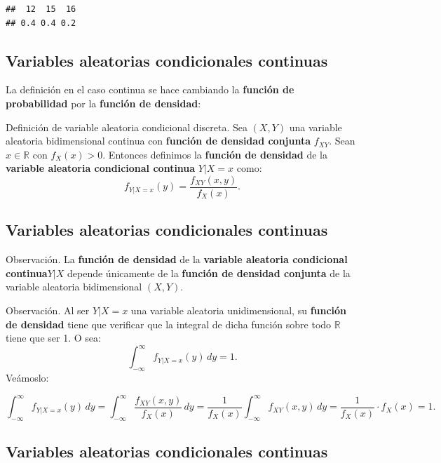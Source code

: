 \documentclass[]{book}
\begin{document}
\begin{verbatim}
##  12  15  16 
## 0.4 0.4 0.2
\end{verbatim}

\hypertarget{variables-aleatorias-condicionales-continuas}{%
\subsection{Variables aleatorias condicionales continuas}\label{variables-aleatorias-condicionales-continuas}}

La definición en el caso continua se hace cambiando la \textbf{función de probabilidad} por la \textbf{función de densidad}:

Definición de variable aleatoria condicional discreta.
Sea \((X,Y)\) una variable aleatoria bidimensional continua con \textbf{función de densidad conjunta} \(f_{XY}\). Sean \(x\in\mathbb{R}\) con \(f_X(x)>0\). Entonces definimos la \textbf{función de densidad} de la \textbf{variable aleatoria condicional continua} \(Y|X=x\) como:
\[
f_{Y|X=x}(y)=\frac{f_{XY}(x,y)}{f_X(x)}.
\]

\hypertarget{variables-aleatorias-condicionales-continuas-1}{%
\subsection{Variables aleatorias condicionales continuas}\label{variables-aleatorias-condicionales-continuas-1}}

Observación.
La \textbf{función de densidad} de la \textbf{variable aleatoria condicional continua\(Y|X\)} depende únicamente de la \textbf{función de densidad conjunta} de la variable aleatoria bidimensional \((X,Y)\).

Observación.
Al ser \(Y|X=x\) una variable aleatoria unidimensional, su \textbf{función de densidad} tiene que verificar que la integral de dicha función sobre todo \(\mathbb{R}\) tiene que ser 1. O sea:
\[
\int_{-\infty}^\infty f_{Y|X=x}(y)\, dy=1.
\]
Veámoslo:

\[
\int_{-\infty}^\infty f_{Y|X=x}(y)\, dy =\int_{-\infty}^\infty \frac{f_{XY}(x,y)}{f_X(x)}\, dy=\frac{1}{f_X(x)}\int_{-\infty}^\infty f_{XY}(x,y)\, dy= \frac{1}{f_X(x)}\cdot f_X(x) =1.
\]

\hypertarget{variables-aleatorias-condicionales-continuas-2}{%
\subsection{Variables aleatorias condicionales continuas}\label{variables-aleatorias-condicionales-continuas-2}}
\end{document}
